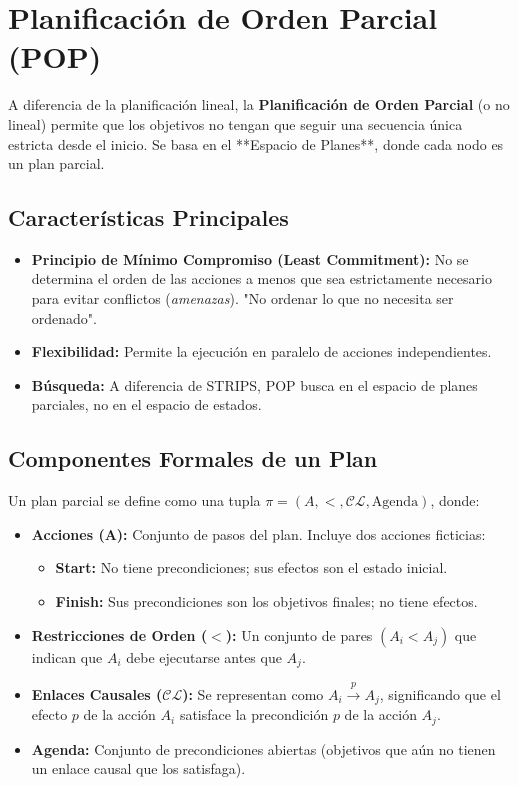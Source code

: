 \section{Planificación de Orden Parcial (POP)}
A diferencia de la planificación lineal, la \textbf{Planificación de Orden Parcial} (o no lineal) permite que los objetivos no tengan que seguir una secuencia única estricta desde el inicio. Se basa en el **Espacio de Planes**, donde cada nodo es un plan parcial.

\subsection{Características Principales}
\begin{itemize}
    \item \textbf{Principio de Mínimo Compromiso (Least Commitment):} No se determina el orden de las acciones a menos que sea estrictamente necesario para evitar conflictos (\textit{amenazas}). "No ordenar lo que no necesita ser ordenado".
    \item \textbf{Flexibilidad:} Permite la ejecución en paralelo de acciones independientes.
    \item \textbf{Búsqueda:} A diferencia de STRIPS, POP busca en el espacio de planes parciales, no en el espacio de estados.
\end{itemize}

\subsection{Componentes Formales de un Plan}
Un plan parcial se define como una tupla $\pi = (A, <, \mathcal{CL}, \text{Agenda})$, donde:
\begin{itemize}
    \item \textbf{Acciones (A):} Conjunto de pasos del plan. Incluye dos acciones ficticias:
    \begin{itemize}
        \item \textbf{Start:} No tiene precondiciones; sus efectos son el estado inicial.
        \item \textbf{Finish:} Sus precondiciones son los objetivos finales; no tiene efectos.
    \end{itemize}
    \item \textbf{Restricciones de Orden ($<$):} Un conjunto de pares $(A_i < A_j)$ que indican que $A_i$ debe ejecutarse antes que $A_j$.
    \item \textbf{Enlaces Causales ($\mathcal{CL}$):} Se representan como $A_i \xrightarrow{p} A_j$, significando que el efecto $p$ de la acción $A_i$ satisface la precondición $p$ de la acción $A_j$.
    \item \textbf{Agenda:} Conjunto de precondiciones abiertas (objetivos que aún no tienen un enlace causal que los satisfaga).
\end{itemize}


